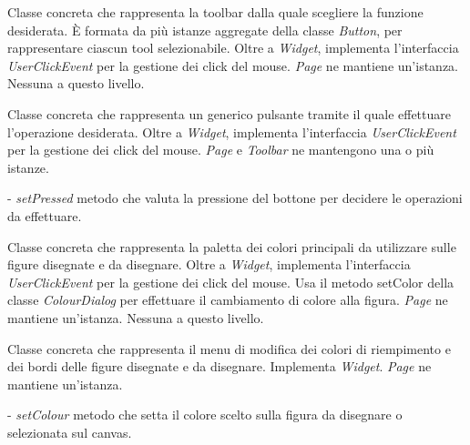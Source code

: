 Classe concreta che rappresenta la toolbar dalla quale scegliere la funzione desiderata.
\` E formata da pi\` u istanze aggregate della classe \textit{Button}, per rappresentare ciascun tool selezionabile. Oltre a \textit{Widget}, implementa l'interfaccia \textit{UserClickEvent} per la gestione dei click del mouse. 
\textit{Page} ne mantiene un'istanza.
Nessuna a questo livello.

Classe concreta che rappresenta un generico pulsante tramite il quale effettuare l'operazione desiderata.
Oltre a \textit{Widget}, implementa l'interfaccia \textit{UserClickEvent} per la gestione dei click del mouse.  
\textit{Page} e \textit{Toolbar }ne mantengono una o pi\` u istanze.
\begin{elencopuntato}[\normindent]
\item[-]  \textit{setPressed} metodo che valuta la pressione del bottone per decidere le operazioni da effettuare.
\end{elencopuntato}

Classe concreta che rappresenta la paletta dei colori principali da utilizzare sulle figure disegnate e da disegnare.
Oltre a \textit{Widget}, implementa l'interfaccia \textit{UserClickEvent} per la gestione dei click del mouse. Usa il metodo setColor della classe \textit{ColourDialog} per effettuare il cambiamento di colore alla figura.
\textit{Page} ne mantiene un'istanza.
Nessuna a questo livello.

Classe concreta che rappresenta il menu di modifica dei colori di riempimento e dei bordi delle figure disegnate e da disegnare.
Implementa \textit{Widget}.
\textit{Page} ne mantiene un'istanza.
\begin{elencopuntato}[\normindent]
\item[-]  \textit{setColour} metodo che setta il colore scelto sulla figura da disegnare o selezionata sul canvas.
\end{elencopuntato}


